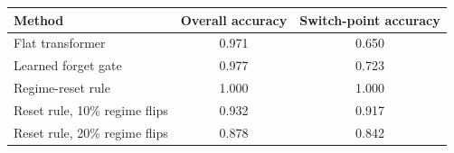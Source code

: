 \begin{tabular}{lcc}
\toprule
Method & Overall accuracy & Switch-point accuracy \\
\midrule
Flat transformer & 0.971 & 0.650 \\
Learned forget gate & 0.977 & 0.723 \\
Regime-reset rule & 1.000 & 1.000 \\
Reset rule, 10\% regime flips & 0.932 & 0.917 \\
Reset rule, 20\% regime flips & 0.878 & 0.842 \\
\bottomrule
\end{tabular}
